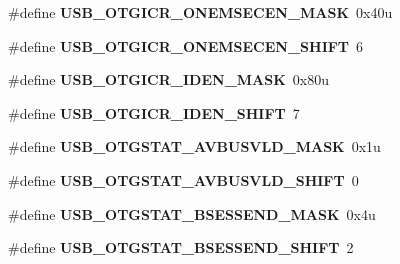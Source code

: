 \begin{DoxyCompactItemize}
\item 
\#define {\bfseries U\+S\+B\+\_\+\+O\+T\+G\+I\+C\+R\+\_\+\+O\+N\+E\+M\+S\+E\+C\+E\+N\+\_\+\+M\+A\+SK}~0x40u\hypertarget{group__USB__Register__Masks_gac68531fd32d53520e1d1ccdd4cfae9ec}{}\label{group__USB__Register__Masks_gac68531fd32d53520e1d1ccdd4cfae9ec}

\item 
\#define {\bfseries U\+S\+B\+\_\+\+O\+T\+G\+I\+C\+R\+\_\+\+O\+N\+E\+M\+S\+E\+C\+E\+N\+\_\+\+S\+H\+I\+FT}~6\hypertarget{group__USB__Register__Masks_ga29ccacd7b79d6d2df3b8743ccd1c467f}{}\label{group__USB__Register__Masks_ga29ccacd7b79d6d2df3b8743ccd1c467f}

\item 
\#define {\bfseries U\+S\+B\+\_\+\+O\+T\+G\+I\+C\+R\+\_\+\+I\+D\+E\+N\+\_\+\+M\+A\+SK}~0x80u\hypertarget{group__USB__Register__Masks_gaa13997b88383cb1aec6f042ecdb94399}{}\label{group__USB__Register__Masks_gaa13997b88383cb1aec6f042ecdb94399}

\item 
\#define {\bfseries U\+S\+B\+\_\+\+O\+T\+G\+I\+C\+R\+\_\+\+I\+D\+E\+N\+\_\+\+S\+H\+I\+FT}~7\hypertarget{group__USB__Register__Masks_ga36d7ef200033a393e023ab06808f7129}{}\label{group__USB__Register__Masks_ga36d7ef200033a393e023ab06808f7129}

\item 
\#define {\bfseries U\+S\+B\+\_\+\+O\+T\+G\+S\+T\+A\+T\+\_\+\+A\+V\+B\+U\+S\+V\+L\+D\+\_\+\+M\+A\+SK}~0x1u\hypertarget{group__USB__Register__Masks_gaad4e0319a6f42042472b52c8d1ec1c77}{}\label{group__USB__Register__Masks_gaad4e0319a6f42042472b52c8d1ec1c77}

\item 
\#define {\bfseries U\+S\+B\+\_\+\+O\+T\+G\+S\+T\+A\+T\+\_\+\+A\+V\+B\+U\+S\+V\+L\+D\+\_\+\+S\+H\+I\+FT}~0\hypertarget{group__USB__Register__Masks_ga66258b09ad8ec5462b8594ce5ac7384c}{}\label{group__USB__Register__Masks_ga66258b09ad8ec5462b8594ce5ac7384c}

\item 
\#define {\bfseries U\+S\+B\+\_\+\+O\+T\+G\+S\+T\+A\+T\+\_\+\+B\+S\+E\+S\+S\+E\+N\+D\+\_\+\+M\+A\+SK}~0x4u\hypertarget{group__USB__Register__Masks_gabcc7c3e58301a6abc07915a5deb92d39}{}\label{group__USB__Register__Masks_gabcc7c3e58301a6abc07915a5deb92d39}

\item 
\#define {\bfseries U\+S\+B\+\_\+\+O\+T\+G\+S\+T\+A\+T\+\_\+\+B\+S\+E\+S\+S\+E\+N\+D\+\_\+\+S\+H\+I\+FT}~2\hypertarget{group__USB__Register__Masks_ga6eb987e49a137057c02e8f2b26e61724}{}\label{group__USB__Register__Masks_ga6eb987e49a137057c02e8f2b26e61724}


\end{DoxyCompactItemize}
